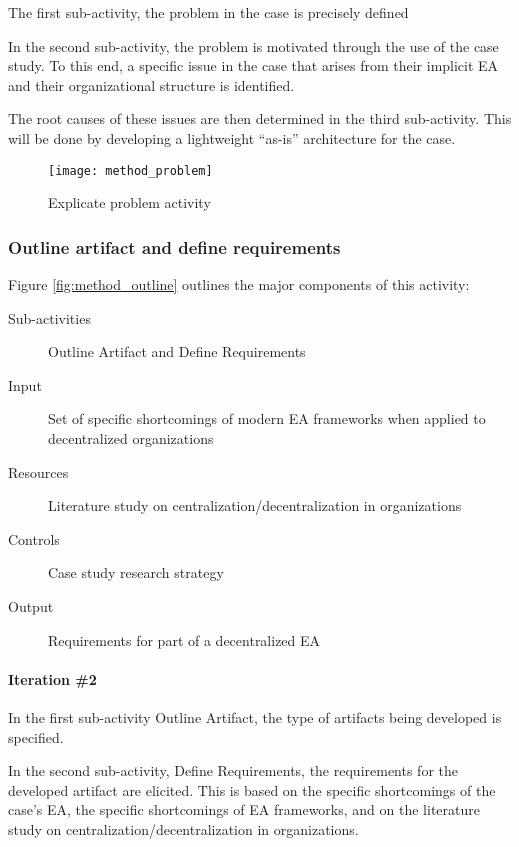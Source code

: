 The first sub-activity, the problem in the case is precisely defined 

In the second sub-activity, the problem is motivated through the use of the case study. To this end, a specific issue in the case that arises from their implicit EA and their organizational structure is identified.

The root causes of these issues are then determined in the third sub-activity. This will be done by developing a lightweight ``as-is'' architecture for the case. 

\begin{figure}
\texttt{[image: method\_problem]}
\caption{Explicate problem activity}
\label{fig:method_problem}
\end{figure}

\subsubsection*{Outline artifact and define requirements}

Figure \ref{fig:method_outline} outlines the major components of this activity:
\begin{description}
  \item[Sub-activities] Outline Artifact and Define Requirements~\cite[Ch. 6]{johannessonPerjons2012}
  \item[Input] Set of specific shortcomings of modern EA frameworks when applied to decentralized organizations
  \item[Resources] Literature study on centralization/decentralization in  organizations
  \item[Controls] Case study research strategy
  \item[Output] Requirements for part of a decentralized EA
\end{description}

\paragraph{Iteration \#2}

In the first sub-activity Outline Artifact, the type of artifacts being developed is specified. 

In the second sub-activity, Define Requirements, the requirements for the developed artifact are elicited. This is based on the specific shortcomings of the case's EA, the specific shortcomings of EA frameworks, and on the literature study on centralization/decentralization in organizations.


